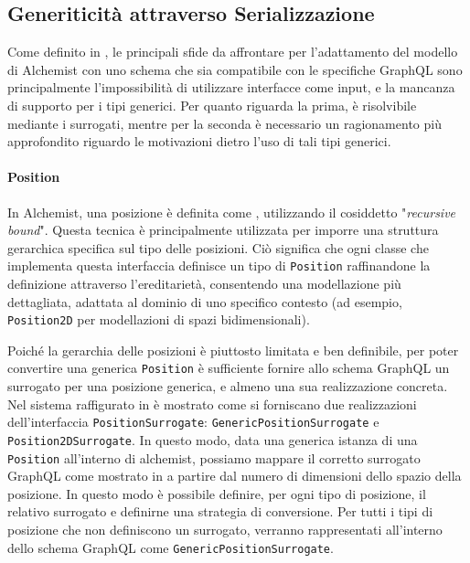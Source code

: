 
\subsection{Generiticità attraverso Serializzazione}\label{ssec:generics-serialize}
Come definito in , le principali sfide da affrontare per l'adattamento del modello di Alchemist con uno schema che sia
compatibile con le specifiche GraphQL sono principalmente l'impossibilità di utilizzare interfacce come input, e la mancanza di supporto per i tipi generici.
Per quanto riguarda la prima, è risolvibile mediante i surrogati, mentre per la seconda è necessario un ragionamento più approfondito riguardo le motivazioni
dietro l'uso di tali tipi generici.

\paragraph{Position}
In Alchemist, una posizione è definita come , utilizzando il cosiddetto "\textit{recursive bound}". Questa tecnica è
principalmente utilizzata per imporre una struttura gerarchica specifica sul tipo delle posizioni. Ciò significa che ogni classe che implementa questa
interfaccia definisce un tipo di \texttt{Position} raffinandone la definizione attraverso l'ereditarietà, consentendo una modellazione più dettagliata,
adattata al dominio di uno specifico contesto (ad esempio, \texttt{Position2D} per modellazioni di spazi bidimensionali).

Poiché la gerarchia delle posizioni è piuttosto limitata e ben definibile, per poter convertire una generica \texttt{Position} è sufficiente fornire
allo schema GraphQL un surrogato per una posizione generica, e almeno una sua realizzazione concreta. Nel sistema raffigurato in 
è mostrato come si forniscano due realizzazioni dell'interfaccia \texttt{PositionSurrogate}: \texttt{GenericPositionSurrogate} e \texttt{Position2DSurrogate}.
In questo modo, data una generica istanza di una \texttt{Position} all'interno di alchemist, possiamo mappare il corretto surrogato GraphQL come mostrato in 
a partire dal numero di dimensioni dello spazio della posizione. In questo modo è possibile definire, per ogni tipo di posizione, il relativo surrogato e definirne
una strategia di conversione. Per tutti i tipi di posizione che non definiscono un surrogato, verranno rappresentati all'interno dello schema GraphQL come
\texttt{GenericPositionSurrogate}.

